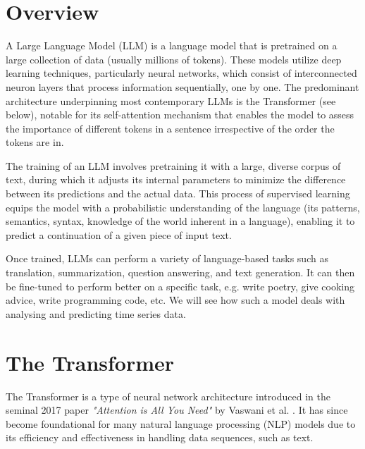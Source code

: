\section{Overview}

A Large Language Model (LLM) \cite{llmintro} is a language model that is pretrained on a large collection of data (usually millions of tokens).
These models utilize deep learning techniques, particularly neural networks, which consist of interconnected neuron layers that process information sequentially, one by one.
The predominant architecture underpinning most contemporary LLMs is the Transformer (see below), notable for its self-attention mechanism that enables the model to assess the importance of different tokens in a sentence irrespective of the order the tokens are in.

The training of an LLM involves pretraining it with a large, diverse corpus of text, during which it adjusts its internal parameters to minimize the difference between its predictions and the actual data. This process of supervised learning equips the model with a probabilistic understanding of the language (its patterns, semantics, syntax, knowledge of the world inherent in a language), enabling it to predict a continuation of a given piece of input text.

Once trained, LLMs can perform a variety of language-based tasks such as translation, summarization, question answering, and text generation.
It can then be fine-tuned to perform better on a specific task, e.g. write poetry, give cooking advice, write programming code, etc.
We will see how such a model deals with analysing and predicting time series data.


\section{The Transformer}

The Transformer is a type of neural network architecture introduced in the seminal 2017 paper \textit{"Attention is All You Need"} by Vaswani et al. \cite{attention_is_all_you_need}. It has since become foundational for many natural language processing (NLP) models due to its efficiency and effectiveness in handling data sequences, such as text.

